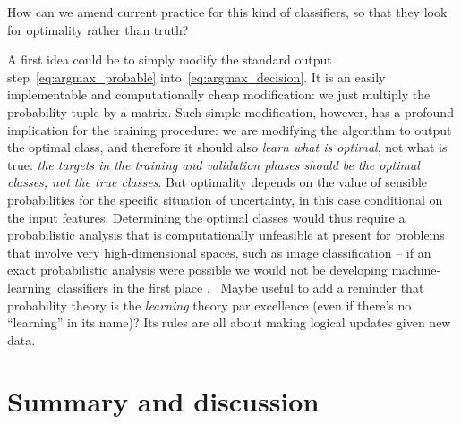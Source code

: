 \documentclass[\ifafour a4paper,12pt,\else a5paper,10pt,\fi%
onecolumn,oneside,article,%
british%
]{memoir}
\makeatletter
\theoremstyle{remark}
\theoremstyle{innote}
\def\sum{\DOTSI\sumop\slimits@}
\newcommand*{\de}{\partialup}%
\newcommand*{\p}{\mathrm{p}}%
\renewcommand*{\|}[1][]{\nonscript\:#1\vert\nonscript\:\mathopen{}}
\newcommand*{\chaps}{chs}%
\newcommand*{\tsum}{\mathop{\textstyle\sum}\nolimits}
\newcommand*{\puzzle}{{\fontencoding{U}\fontfamily{fontawesometwo}\selectfont\symbol{225}}}
\newcommand{\mynote}[1]{ {\color{notecolour}#1}}
\newcommand*{\ml}{machine-learning}
\makeatother
\begin{document}
How can we amend current practice for this kind of classifiers, so that they look for optimality rather than truth?

A first idea could be to simply modify the standard output step~\eqref{eq:argmax_probable} into~\eqref{eq:argmax_decision}. It is an easily implementable and computationally cheap modification: we just multiply the probability tuple by a matrix. Such simple modification, however, has a profound implication for the training procedure: we are modifying the algorithm to output the optimal class, and therefore it should also \emph{learn what is optimal}, not what is true: \emph{the targets in the training and validation phases should be the optimal classes, not the true classes}. But optimality depends on the value of sensible probabilities for the specific situation of uncertainty, in this case conditional on the input features. Determining the optimal classes would thus require a probabilistic analysis that is computationally unfeasible at present for problems that involve very high-dimensional spaces, such as image classification -- if an exact probabilistic analysis were possible we would not be developing \ml\ classifiers in the first place \autocites[\chaps~2, 12]{russelletal1995_r2022}{pearl1988}. \mynote{\puzzle~Maybe useful to add a reminder that probability theory is the \emph{learning} theory par excellence (even if there's no \enquote{learning} in its name)? Its rules are all about making logical updates given new data.}




\section{Summary and discussion}
\label{sec:summary_discussion}


\clearpage


\end{document}
